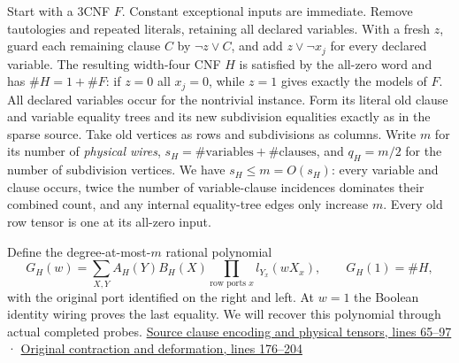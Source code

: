 \documentclass[
  11pt,
]{article}
\begin{document}
Start with a 3CNF \(F\). Constant exceptional inputs are immediate.
Remove tautologies and repeated literals, retaining all declared
variables. With a fresh \(z\), guard each remaining clause \(C\) by
\(\neg z\lor C\), and add \(z\lor\neg x_j\) for every declared variable.
The resulting width-four CNF \(H\) is satisfied by the all-zero word and
has \(\#H=1+\#F\): if \(z=0\) all \(x_j=0\), while \(z=1\) gives exactly
the models of \(F\). All declared variables occur for the nontrivial
instance. Form its literal old clause and variable equality trees and
its new subdivision equalities exactly as in the sparse source. Take old
vertices as rows and subdivisions as columns. Write \(m\) for its number
of \emph{physical wires},
\(s_H=\#\mathrm{variables}+\#\mathrm{clauses}\), and \(q_H=m/2\) for the
number of subdivision vertices. We have \(s_H\le m=O(s_H)\): every
variable and clause occurs, twice the number of variable-clause
incidences dominates their combined count, and any internal
equality-tree edges only increase \(m\). Every old row tensor is one at
its all-zero input.

Define the degree-at-most-\(m\) rational polynomial \[
 G_H(w)=\sum_{X,Y}A_H(Y)B_H(X)
                 \prod_{\text{row ports }x} l_{Y_x}(wX_x),
                 \qquad G_H(1)=\#H ,
\] with the original port identified on the right and left. At \(w=1\)
the Boolean identity wiring proves the last equality. We will recover
this polynomial through actual completed probes.
\href{https://github.com/openai/math/blob/main/preprints/The-Exponential-Time-Hypothesis-is-False-October-25-2026/build/quantitative-reduction.tex\#L65}{Source
clause encoding and physical tensors, lines 65--97} ·
\href{https://github.com/openai/math/blob/main/preprints/The-Exponential-Time-Hypothesis-is-False-October-25-2026/build/quantitative-contraction.tex\#L176}{Original
contraction and deformation, lines 176--204}
\end{document}
